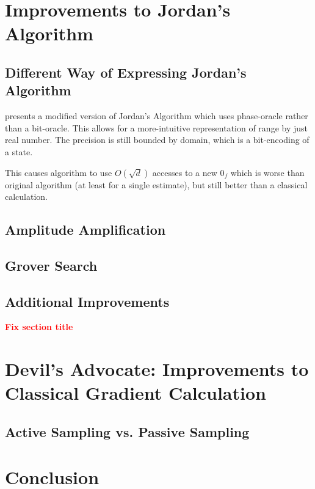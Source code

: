 \documentclass{article}
\begin{document}
\section{Improvements to Jordan's Algorithm}
\label{sec:jor-improv}
\subsection{Different Way of Expressing Jordan's Algorithm}
\cite{Gily_n_2019} presents a modified version of Jordan's Algorithm which uses phase-oracle rather than a bit-oracle.
This allows for a more-intuitive representation of range by just real number. The precision is still bounded by domain,
which is a bit-encoding of a state.

This causes algorithm to use $O(\sqrt{d})$ accesses to a new $0_f$ which is worse than original algorithm (at least for a single estimate),
but still better than a classical calculation.

\subsection{Amplitude Amplification}
\subsection{Grover Search}
\subsection{Additional Improvements}
\textbf{\textcolor{red}{Fix section title}}

\section{Devil's Advocate: Improvements to Classical Gradient Calculation}
\label{sec:class-imp}
\subsection{Active Sampling vs. Passive Sampling}

\section{Conclusion}
\label{sec:conclusion}
\printbibliography
\end{document}
